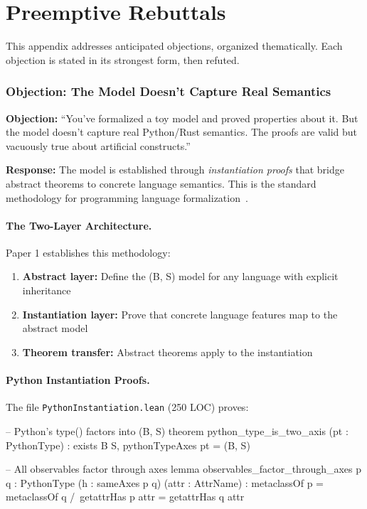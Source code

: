 \section{Preemptive Rebuttals}\label{sec:rebuttals}

This appendix addresses anticipated objections, organized thematically. Each objection is stated in its strongest form, then refuted.


\subsubsection{Objection: The Model Doesn't Capture Real Semantics}

\textbf{Objection:} ``You've formalized a toy model and proved properties about it. But the model doesn't capture real Python/Rust semantics. The proofs are valid but vacuously true about artificial constructs.''

\textbf{Response:} The model is established through \emph{instantiation proofs} that bridge abstract theorems to concrete language semantics. This is the standard methodology for programming language formalization~\cite{pierce2002types}.

\paragraph{The Two-Layer Architecture.} Paper 1 establishes this methodology:

\begin{enumerate}
\item \textbf{Abstract layer:} Define the (B, S) model for any language with explicit inheritance
\item \textbf{Instantiation layer:} Prove that concrete language features map to the abstract model
\item \textbf{Theorem transfer:} Abstract theorems apply to the instantiation
\end{enumerate}

\paragraph{Python Instantiation Proofs.} The file \texttt{PythonInstantiation.lean} (250 LOC) proves:

\begin{code}
-- Python's type() factors into (B, S)
theorem python_type_is_two_axis (pt : PythonType) :
    exists B S, pythonTypeAxes pt = (B, S)

-- All observables factor through axes
lemma observables_factor_through_axes {p q : PythonType}
    (h : sameAxes p q) (attr : AttrName) :
    metaclassOf p = metaclassOf q /\
    getattrHas p attr = getattrHas q attr
\end{code}

